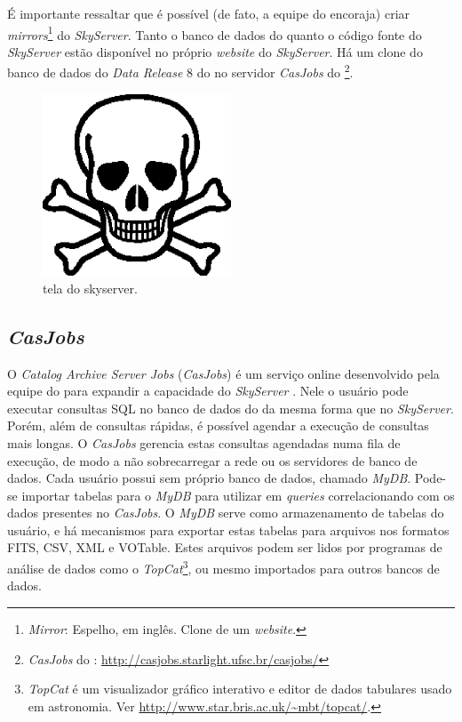 É importante ressaltar que é possível (de fato, a equipe do \SDSS encoraja)
criar {\em mirrors}\footnote{{\em Mirror}: Espelho, em inglês. Clone de um {\em
website}.} do {\em SkyServer}. Tanto o banco de dados do \SDSS quanto o código
fonte do {\em SkyServer} estão disponível no próprio {\em website} do {\em
SkyServer}. Há um clone do banco de dados do {\em Data Release} 8 do \SDSS no
servidor {\em CasJobs} do \starlight \footnote{{\em CasJobs} do \starlight:
\url{http://casjobs.starlight.ufsc.br/casjobs/}}.

\begin{figure}
	\includegraphics[width=0.5\textwidth]{figuras/test.eps}
	\caption[Tela do skyserver.]
	{tela do skyserver.}
	\label{fig:TelaDoSkyServer}
\end{figure}

\subsection{{\em CasJobs}}
\label{sec:CrossMatch:SDSS:CasJobs}
O {\em Catalog Archive Server Jobs} ({\em CasJobs}) é um serviço online
desenvolvido pela equipe do \SDSS para expandir a capacidade do {\em SkyServer}
\citep{Li2008}. Nele o usuário pode executar consultas SQL no banco de dados do
\SDSS da mesma forma que no {\em SkyServer}. Porém, além de consultas rápidas, é
possível agendar a execução de consultas mais longas. O {\em CasJobs} gerencia
estas consultas agendadas numa fila de execução, de modo a não sobrecarregar a
rede ou os servidores de banco de dados. Cada usuário possui sem próprio banco
de dados, chamado {\em MyDB}. Pode-se importar tabelas para o {\em MyDB} para
utilizar em {\em queries} correlacionando com os dados presentes no {\em
CasJobs}. O {\em MyDB} serve como armazenamento de tabelas do usuário, e há
mecanismos para exportar estas tabelas para arquivos nos formatos FITS, CSV, XML
e VOTable. Estes arquivos podem ser lidos por programas de análise de dados como
o {\em TopCat}\footnote{{\em TopCat} é um visualizador gráfico interativo e
editor de dados tabulares usado em astronomia. Ver
\url{http://www.star.bris.ac.uk/~mbt/topcat/}.}, ou mesmo importados para outros
bancos de dados.

